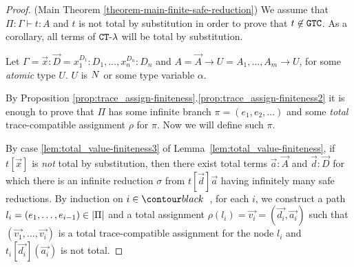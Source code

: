 \begin{proof}(Main Theorem \ref{theorem-main-finite-safe-reduction})
  We assume that $\Pi:\Gamma \vdash t: A$ 
  and $t$ is not total by substitution in order to prove that
  $t \not \in {\tt GTC}$. As a corollary, all terms of ${ {\tt CT}\mbox{-}\lambda}$ will be total by substitution.
 
  Let $\Gamma = \vec{x}:\vec{D} = x_1^{D_1}:D_1, \ldots, x_n^{D_n}:D_n$ 
  and $A = \vec{A}\rightarrow U = A_1, \ldots, A_m \rightarrow U$, 
  for some \emph{atomic} type $U$. $U$ is ${N}$ or some type variable $\alpha$.
   
  By Proposition \ref{prop:trace_assign-finiteness}.\ref{prop:trace_assign-finiteness2} 
  it is enough to prove that
  $\Pi$ has some infinite branch $\pi=(e_1, e_2, \ldots)$ 
  and some \emph{total} trace-compatible assignment $\rho$ for $\pi$.
  Now we will define such $\pi$.
  
  By case \ref{lem:total_value-finiteness3} of Lemma~\ref{lem:total_value-finiteness},
  if $t[\vec{x}]$ is \emph{not} total by substitution, then 
  there exist total terms $\vec{a}:\vec{A}$ and $\vec{d}:\vec{D}$ for which there is
  an infinite reduction $\sigma$ from $t[\vec{d}]\vec{a}$ having infinitely many safe  
  reductions.
  By induction on $i \in \Nat$, for each $i$, we construct a path 
  $l_i = (e_1,\ldots,e_{i-1}) \in {|\Pi|}$
  and a total assignment $\rho(l_i) = \vec{v_i} = (\vec{d_i},\vec{a_i})$ such that
  $(\vec{v_1},\ldots,\vec{v_i})$ is a total trace-compatible assignment for the node $l_i$
  and $t_{i}[\vec{d_{i}}](\vec{a_{i}})$ is not total.

  

\end{proof}
